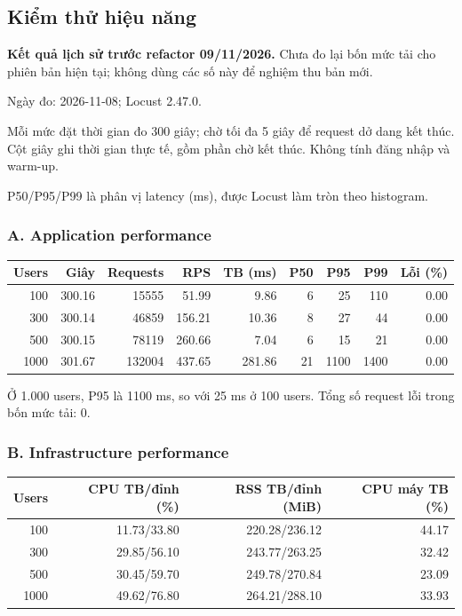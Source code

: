 \subsection{Kiểm thử hiệu năng}

\textbf{Kết quả lịch sử trước refactor 09/11/2026.} Chưa đo lại bốn mức tải cho phiên bản hiện tại; không dùng các số này để nghiệm thu bản mới.

Ngày đo: 2026-11-08; Locust 2.47.0.

Mỗi mức đặt thời gian đo 300 giây; chờ tối đa 5 giây để request dở dang kết thúc. Cột giây ghi thời gian thực tế, gồm phần chờ kết thúc. Không tính đăng nhập và warm-up.

P50/P95/P99 là phân vị latency (ms), được Locust làm tròn theo histogram.

\subsubsection*{A. Application performance}

\begin{center}\small
\setlength{\tabcolsep}{3pt}
\begin{tabular}{@{}rrrrrrrrr@{}}
\toprule
\textbf{Users} & \textbf{Giây} & \textbf{Requests} & \textbf{RPS} & \textbf{TB (ms)} & \textbf{P50} & \textbf{P95} & \textbf{P99} & \textbf{Lỗi (\%)} \\
\midrule
100 & 300.16 & 15555 & 51.99 & 9.86 & 6 & 25 & 110 & 0.00 \\
300 & 300.14 & 46859 & 156.21 & 10.36 & 8 & 27 & 44 & 0.00 \\
500 & 300.15 & 78119 & 260.66 & 7.04 & 6 & 15 & 21 & 0.00 \\
1000 & 301.67 & 132004 & 437.65 & 281.86 & 21 & 1100 & 1400 & 0.00 \\
\bottomrule
\end{tabular}
\end{center}

Ở 1.000 users, P95 là 1100 ms, so với 25 ms ở 100 users. Tổng số request lỗi trong bốn mức tải: 0.

\subsubsection*{B. Infrastructure performance}

\begin{center}\small
\setlength{\tabcolsep}{3pt}
\begin{tabular}{@{}rrrr@{}}
\toprule
\textbf{Users} & \textbf{CPU TB/đỉnh (\%)} & \textbf{RSS TB/đỉnh (MiB)} & \textbf{CPU máy TB (\%)} \\
\midrule
100 & 11.73/33.80 & 220.28/236.12 & 44.17 \\
300 & 29.85/56.10 & 243.77/263.25 & 32.42 \\
500 & 30.45/59.70 & 249.78/270.84 & 23.09 \\
1000 & 49.62/76.80 & 264.21/288.10 & 33.93 \\
\bottomrule
\end{tabular}
\end{center}

